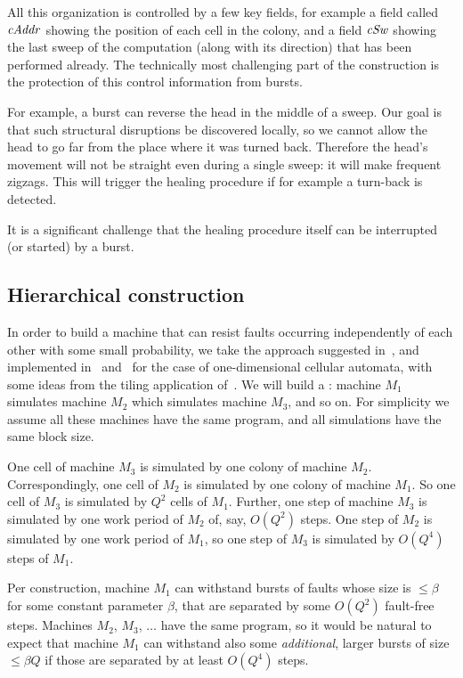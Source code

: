 \documentclass[12pt]{memoir}
\renewcommand{\le}{\leq}
\newcommand{\fld}[1]{\ensuremath{\textit{#1\/}}}
\newcommand{\cAddr}{\fld{cAddr}}
\newcommand{\cSweep}{\fld{cSw}}
\begin{document}
All this organization is controlled by a few key fields, for example a field
called \( \cAddr \) showing the position of each cell in the colony, and a field
\( \cSweep \) showing the last sweep of the computation (along with its direction)
that has been performed already.
The technically most challenging part of the construction is the protection of this
control information from bursts.

For example, a burst can reverse the head in the middle of a sweep.
Our goal is that such structural disruptions be discovered locally, so
we cannot allow the head to go far from the place where it was turned back.
Therefore the head's movement will not be straight even during a single
sweep: it will make frequent zigzags.
This will trigger the healing procedure if for example a turn-back is detected.

It is a significant challenge that the healing procedure
itself can be interrupted (or started) by a burst.


\subsection{Hierarchical construction}\label{sec:hier}

In order to build a machine that can resist faults 
occurring independently of each other with some small probability,
we take the approach suggested in~\cite{Kurd78},
and implemented in~\cite{Gacs1dim86} and~\cite{GacsSorg01}
for the case of one-dimensional cellular automata, with some ideas
from the tiling application of~\cite{DurandRomashShenTiling12}.
We will build a :
machine \( M_1 \) simulates machine \( M_2 \) which 
simulates machine \( M_3 \), and so on.
For simplicity we assume all these machines have the same program,
and all simulations have the same block size.

One cell of machine \( M_3 \) is simulated by one colony of machine \( M_2 \).
Correspondingly, one cell of \( M_2 \) is simulated by
one colony of machine \( M_1 \).
So one cell of \( M_3 \) is simulated by \( Q^2 \) cells of \( M_1 \).
Further, one step of machine \( M_3 \) is simulated by one
work period of \( M_2 \) of, say, \( O(Q^{2}) \) steps.
One step of \( M_2 \) is simulated by one work period of \( M_1 \),
so one step of \( M_3 \) is simulated by \( O(Q^{4}) \) steps of \( M_1 \).

Per construction, machine \( M_{1} \) can withstand
bursts of faults whose size is \( \le \beta \) for some constant parameter \( \beta \), that
are separated by some \( O(Q^{2}) \) fault-free steps.
Machines \( M_2 \), \( M_3 \), \( \dots \) have the same program, so it
would be natural to expect that machine
\( M_1 \) can withstand also some \emph{additional}, larger bursts
of size \( \le \beta Q \) if those are separated by at least \( O(Q^{4}) \) steps.
\end{document}
